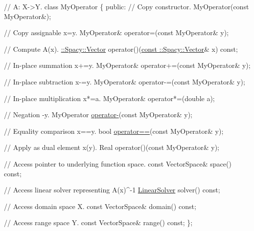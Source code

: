 \begin{DoxyCode}
\textcolor{comment}{// A: X->Y.}
\textcolor{keyword}{class }MyOperator
\{
\textcolor{keyword}{public}:
  \textcolor{comment}{// Copy constructor.}
  MyOperator(\textcolor{keyword}{const} MyOperator&);

  \textcolor{comment}{// Copy assignable x=y.}
  MyOperator& operator=(\textcolor{keyword}{const} MyOperator& y);

  \textcolor{comment}{// Compute A(x).}
  \hyperlink{classSpacy_1_1Vector}{::Spacy::Vector} operator()(\hyperlink{group__VectorSpaceGroup_gafda42fd5aa3f7597a42b9831bf4dfd07}{const ::Spacy::Vector}& x) \textcolor{keyword}{const};

  \textcolor{comment}{// In-place summation x+=y.}
  MyOperator& operator+=(\textcolor{keyword}{const} MyOperator& y);

  \textcolor{comment}{// In-place subtraction x-=y.}
  MyOperator& operator-=(\textcolor{keyword}{const} MyOperator& y);

  \textcolor{comment}{// In-place multiplication x*=a.}
  MyOperator& operator*=(\textcolor{keywordtype}{double} a);

  \textcolor{comment}{// Negation -y.}
  MyOperator \hyperlink{namespaceSpacy_a8bc98f51c7beab86185bf97a29b36395}{operator-}(\textcolor{keyword}{const} MyOperator& y);

  \textcolor{comment}{// Equality comparison x==y.}
  \textcolor{keywordtype}{bool} \hyperlink{namespaceSpacy_aef4930427aac4c8089b4c43b1c97cf25}{operator==}(\textcolor{keyword}{const} MyOperator& y);

  \textcolor{comment}{// Apply as dual element x(y).}
  Real operator()(\textcolor{keyword}{const} MyOperator& y);

  \textcolor{comment}{// Access pointer to underlying function space.}
  \textcolor{keyword}{const} VectorSpace& space() \textcolor{keyword}{const};

  \textcolor{comment}{// Access linear solver representing A(x)^-1}
 \hyperlink{namespaceSpacy_a4cd614ddb41dd29e68a723dadd5602f2}{LinearSolver} solver() \textcolor{keyword}{const};

  \textcolor{comment}{// Access domain space X.}
  \textcolor{keyword}{const} VectorSpace& domain() \textcolor{keyword}{const};

  \textcolor{comment}{// Access range space Y.}
  \textcolor{keyword}{const} VectorSpace& range() \textcolor{keyword}{const};
\};
\end{DoxyCode}


